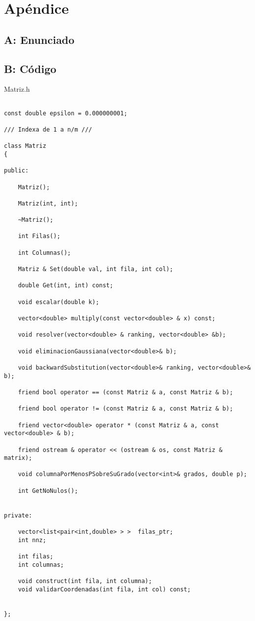\section{Apéndice} \label{cap:apendice}
\subsection{A: Enunciado}


\subsection{B: Código}

\begin{center}
{\small Matriz.h\\}
\end{center}
\begin{lstlisting}

const double epsilon = 0.000000001;

/// Indexa de 1 a n/m ///

class Matriz
{

public:

    Matriz();

    Matriz(int, int);

    ~Matriz();

    int Filas();

    int Columnas();

    Matriz & Set(double val, int fila, int col); 

    double Get(int, int) const;

    void escalar(double k);    

    vector<double> multiply(const vector<double> & x) const;

    void resolver(vector<double> & ranking, vector<double> &b);

    void eliminacionGaussiana(vector<double>& b);

    void backwardSubstitution(vector<double>& ranking, vector<double>& b);

    friend bool operator == (const Matriz & a, const Matriz & b);

    friend bool operator != (const Matriz & a, const Matriz & b);

    friend vector<double> operator * (const Matriz & a, const vector<double> & b);

    friend ostream & operator << (ostream & os, const Matriz & matrix);

    void columnaPorMenosPSobreSuGrado(vector<int>& grados, double p);

    int GetNoNulos();


private:
    
    vector<list<pair<int,double> > >  filas_ptr;
    int nnz;

    int filas;
    int columnas;

    void construct(int fila, int columna);
    void validarCoordenadas(int fila, int col) const;


};


\end{lstlisting}

